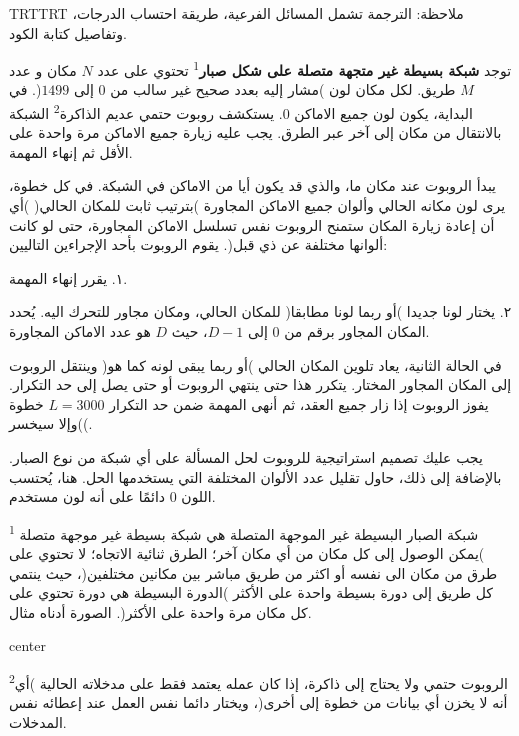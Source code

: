 \documentclass[12pt]{article}
\newenvironment{Arabic}     %
    {\textdir TRT\pardir TRT\arabicfont}{}
\begin{document}
\renewcommand{\round}{Day 2}
\renewcommand{\problemName}{Task Navigation}
\renewcommand{\lang}{Arabic}

\renewcommand{\tl}{$3$ sec.}
\renewcommand{\ml}{$512$ MB}
\problem{\problemName}

\begin{Arabic}
ملاحظة: الترجمة تشمل المسائل الفرعية، طريقة احتساب الدرجات، وتفاصيل كتابة الكود.

توجد \textbf{شبكة بسيطة غير متجهة متصلة على شكل صبار}\textsuperscript{1} تحتوي على عدد $N$ مكان و عدد $M$ طريق. لكل مكان لون )مشار إليه بعدد صحيح غير سالب من $0$ إلى $1499$(. في البداية، يكون لون جميع الاماكن $0$. يستكشف روبوت حتمي عديم الذاكرة\textsuperscript{2} الشبكة بالانتقال من مكان إلى آخر عبر الطرق. يجب عليه زيارة جميع الاماكن مرة واحدة على الأقل ثم إنهاء المهمة.

يبدأ الروبوت عند مكان ما، والذي قد يكون أيا من الاماكن في الشبكة. في كل خطوة، يرى لون مكانه الحالي وألوان جميع الاماكن المجاورة )بترتيب ثابت للمكان الحالي( )أي أن إعادة زيارة المكان ستمنح الروبوت نفس تسلسل الاماكن المجاورة، حتى لو كانت ألوانها مختلفة عن ذي قبل(. يقوم الروبوت بأحد الإجراءين التاليين:

١. يقرر إنهاء المهمة.

٢. يختار لونا جديدا )أو ربما لونا مطابقا( للمكان الحالي، ومكان مجاور للتحرك اليه. يُحدد المكان المجاور برقم من $0$ إلى $D-1$، حيث $D$ هو عدد الاماكن المجاورة.

في الحالة الثانية، يعاد تلوين المكان الحالي )أو ربما يبقى لونه كما هو( وينتقل الروبوت إلى المكان المجاور المختار. يتكرر هذا حتى ينتهي الروبوت أو حتى يصل إلى حد التكرار. يفوز الروبوت إذا زار جميع العقد، ثم أنهى المهمة ضمن حد التكرار $L = 3000$ خطوة )وإلا سيخسر(.

يجب عليك تصميم استراتيجية للروبوت لحل المسألة على أي شبكة من نوع الصبار. بالإضافة إلى ذلك، حاول تقليل عدد الألوان المختلفة التي يستخدمها الحل. هنا، يُحتسب اللون $0$ دائمًا على أنه لون مستخدم.

\textsuperscript{1}
شبكة الصبار البسيطة غير الموجهة المتصلة هي شبكة بسيطة غير موجهة متصلة )يمكن الوصول إلى كل مكان من أي مكان آخر؛ الطرق ثنائية الاتجاه؛ لا تحتوي على طرق من مكان الى نفسه أو اكثر من طريق مباشر بين مكانين مختلفين(، حيث ينتمي كل طريق إلى دورة بسيطة واحدة على الأكثر )الدورة البسيطة هي دورة تحتوي على كل مكان مرة واحدة على الأكثر(. الصورة أدناه مثال.

\begin{adjustbox}{center}

\end{adjustbox}

\textsuperscript{2}الروبوت حتمي ولا يحتاج إلى ذاكرة، إذا كان عمله يعتمد فقط على مدخلاته الحالية )أي أنه لا يخزن أي بيانات من خطوة إلى أخرى(، ويختار دائما نفس العمل عند إعطائه نفس المدخلات.

\end{Arabic}
\end{document}
